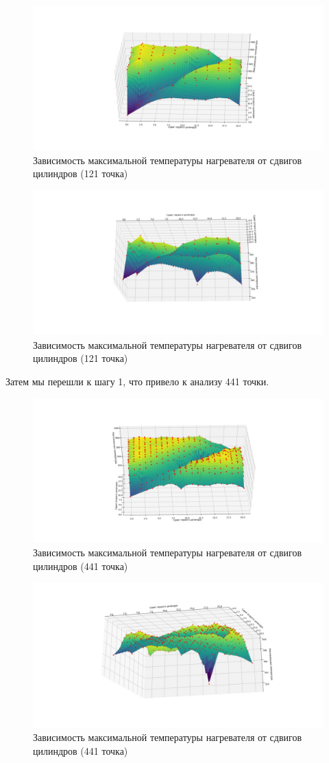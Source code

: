 \documentclass[a4paper,12pt]{article}
\theoremstyle{plain} %
\theoremstyle{definition} %
\theoremstyle{remark} %
\begin{document}
\begin{figure}[h]
	\begin{center}
		\includegraphics[width=0.4\linewidth]{17.1.jpg}
		\caption{Зависимость максимальной температуры нагревателя от сдвигов цилиндров (121 точка)} %
	\end{center}
\end{figure}
\begin{figure}[h]
	\begin{center}
		\includegraphics[width=0.4\linewidth]{17.2.jpg}
		\caption{Зависимость максимальной температуры нагревателя от сдвигов цилиндров (121 точка)} %
	\end{center}
\end{figure}

Затем мы перешли к шагу 1, что привело к анализу 441 точки.

\begin{figure}[h]
	\begin{center}
		\includegraphics[width=0.4\linewidth]{18.1.jpg}
		\caption{Зависимость максимальной температуры нагревателя от сдвигов цилиндров (441 точка)} %
	\end{center}
\end{figure}
\begin{figure}[h]
	\begin{center}
		\includegraphics[width=0.4\linewidth]{18.2.jpg}
		\caption{Зависимость максимальной температуры нагревателя от сдвигов цилиндров (441 точка)} %
	\end{center}
\end{figure}
\end{document}
